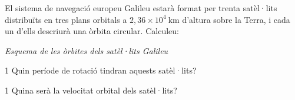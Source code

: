 El sistema de navegació europeu Galileu estarà format per trenta satèl·lits distribuïts en tres plans orbitals a $2,36\times 10^{4}\ \mathrm{km}$ d'altura sobre la Terra, i cada un d'ells descriurà una òrbita circular. Calculeu:

{\centering\textit{Esquema de les òrbites dels satèl·lits Galileu}\par}

\begin{apartat}{1}
Quin període de rotació tindran aquests satèl·lits?
\end{apartat}

\begin{apartat}{1}
Quina serà la velocitat orbital dels satèl·lits?
\end{apartat}

